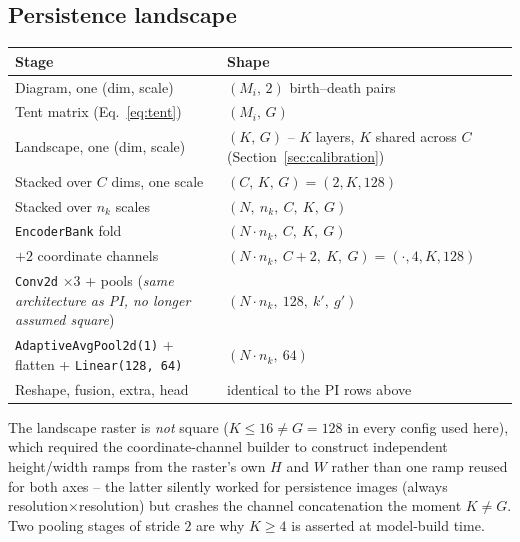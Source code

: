 \documentclass[11pt]{article}
\newcommand{\Nb}{N}
\newcommand{\nk}{n_k}
\begin{document}
\subsection{Persistence landscape}
\begin{center}
\begin{tabular}{@{}p{6.6cm}p{8.6cm}@{}}
\toprule
Stage & Shape \\
\midrule
Diagram, one (dim, scale) & $(M_i,\,2)$ birth--death pairs \\
Tent matrix (Eq.~\ref{eq:tent}) & $(M_i,\,G)$ \\
Landscape, one (dim, scale) & $(K,\,G)$ -- $K$ layers, $K$ shared across $C$ (Section~\ref{sec:calibration}) \\
Stacked over $C$ dims, one scale & $(C,\,K,\,G) = (2,K,128)$ \\
Stacked over $\nk$ scales & $(\Nb,\ \nk,\ C,\ K,\ G)$ \\
\texttt{EncoderBank} fold & $(\Nb\!\cdot\!\nk,\ C,\ K,\ G)$ \\
$+2$ coordinate channels & $(\Nb\!\cdot\!\nk,\ C{+}2,\ K,\ G) = (\cdot,4,K,128)$ \\
\texttt{Conv2d} $\times3$ + pools (\emph{same architecture as PI, no longer assumed square}) & $(\Nb\!\cdot\!\nk,\ 128,\ k',\ g')$ \\
\texttt{AdaptiveAvgPool2d(1)} + flatten + \texttt{Linear(128,\,64)} & $(\Nb\!\cdot\!\nk,\ 64)$ \\
Reshape, fusion, extra, head & identical to the PI rows above \\
\bottomrule
\end{tabular}
\end{center}
The landscape raster is \emph{not} square ($K\le16 \ne G=128$ in every config used
here), which required the coordinate-channel builder to construct independent
height/width ramps from the raster's own $H$ and $W$ rather than one ramp reused for
both axes -- the latter silently worked for persistence images (always
resolution$\times$resolution) but crashes the channel concatenation the moment $K\neq
G$. Two pooling stages of stride $2$ are why $K\ge4$ is asserted at model-build time.
\end{document}

